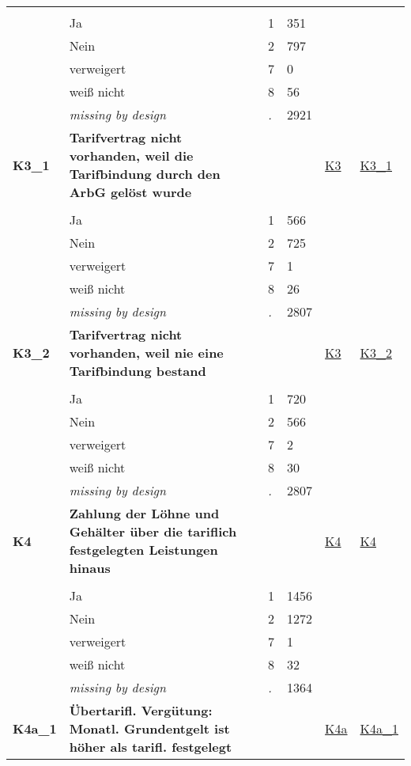 \begin{longtable}{| L{2.45cm} | L{6cm} | C{1.5cm} | R{1cm} | C{2.25cm} | C{2.25cm} |}
   &  &  &  &  &  \\ 
   & Ja & 1 & 351 &  &  \\ 
   & Nein & 2 & 797 &  &  \\ 
   & verweigert & 7 & 0 &  &  \\ 
   & weiß nicht & 8 & 56 &  &  \\ 
   & \textit{missing by design} & \textit{.} & 2921 &  &  \\ 
   \midrule
\textbf{K3\_1}\label{var:K3:1} & \textbf{Tarifvertrag nicht vorhanden, weil die Tarifbindung durch den ArbG gelöst wurde} &  &  & \hyperref[K3]{K3} & \hyperref[var:suf:K3:1]{K3\_1} \\ 
   &  &  &  &  &  \\ 
   & Ja & 1 & 566 &  &  \\ 
   & Nein & 2 & 725 &  &  \\ 
   & verweigert & 7 & 1 &  &  \\ 
   & weiß nicht & 8 & 26 &  &  \\ 
   & \textit{missing by design} & \textit{.} & 2807 &  &  \\ 
   \midrule
\textbf{K3\_2}\label{var:K3:2} & \textbf{Tarifvertrag nicht vorhanden, weil nie eine Tarifbindung bestand} &  &  & \hyperref[K3]{K3} & \hyperref[var:suf:K3:2]{K3\_2} \\ 
   &  &  &  &  &  \\ 
   & Ja & 1 & 720 &  &  \\ 
   & Nein & 2 & 566 &  &  \\ 
   & verweigert & 7 & 2 &  &  \\ 
   & weiß nicht & 8 & 30 &  &  \\ 
   & \textit{missing by design} & \textit{.} & 2807 &  &  \\ 
   \midrule
\textbf{K4}\label{var:K4} & \textbf{Zahlung der Löhne und Gehälter über die tariflich festgelegten Leistungen hinaus} &  &  & \hyperref[K4]{K4} & \hyperref[var:suf:K4]{K4} \\ 
   &  &  &  &  &  \\ 
   & Ja & 1 & 1456 &  &  \\ 
   & Nein & 2 & 1272 &  &  \\ 
   & verweigert & 7 & 1 &  &  \\ 
   & weiß nicht & 8 & 32 &  &  \\ 
   & \textit{missing by design} & \textit{.} & 1364 &  &  \\ 
   \midrule
\textbf{K4a\_1}\label{var:K4a:1} & \textbf{Übertarifl. Vergütung: Monatl. Grundentgelt ist höher als tarifl. festgelegt} &  &  & \hyperref[K4a]{K4a} & \hyperref[var:suf:K4a:1]{K4a\_1} \\ 

\end{longtable}

